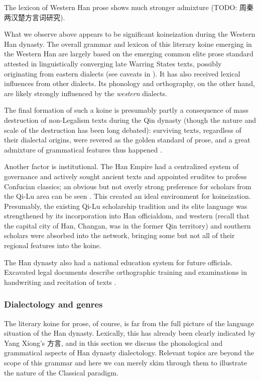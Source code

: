 \documentclass[UTF8, a4paper, oneside, scheme=plain, 12pt]{ctexrep}
\newcommand*{\citepage}[1]{p.~{#1}}
\begin{document}
The lexicon of Western Han prose shows much stronger admixture (TODO: 周秦两汉楚方言词研究).

What we observe above appears to be significant koineization during the Western Han dynasty.
The overall grammar and lexicon of this literary koine emerging in the Western Han are largely based on the emerging common elite prose standard attested in linguistically converging late Warring States texts,
possibly originating from eastern dialects 
(see caveats in ).
It has also received lexical influences from other dialects.
Its phonology and orthography, on the other hand, are likely strongly influenced by the \emph{western} dialects.

The final formation of such a koine is presumably partly a consequence of mass destruction of non-Legalism texts during the Qin dynasty (though the nature and scale of the destruction has been long debated):
surviving texts, regardless of their dialectal origins, were revered as the golden standard of prose, and a great admixture of grammatical features thus happened \citep[\citepage{94}]{karlgren1936zuozhuan}.

Another factor is institutional.
The Han Empire had a centralized system of governance and actively sought ancient texts and appointed erudites to profess Confucian classics; an obvious but not overly strong preference for scholars from the Qi-Lu area can be seen \citep{cai2019han}.
This created an ideal environment for koineization.
Presumably, the existing Qi-Lu scholarship tradition and its elite language was strengthened by its incorporation into Han officialdom,
and western (recall that the capital city of Han, Changan, was in the former Qin territory) and southern scholars were absorbed into the network,
bringing some but not all of their regional features into the koine.

The Han dynasty also had a national education system for future officials.
Excavated legal documents describe orthographic training and examinations in handwriting and recitation of texts \citep{li2007scribe}.

\subsubsection{Dialectology and genres}\label{sec:introduction.history.han.dialect}

The literary koine for prose, of course, is far from the full picture of the language situation of the Han dynasty.
Lexically, this has already been clearly indicated by Yang Xiong's 方言,
and in this section we discuss the phonological and grammatical aspects of Han dynasty dialectology. 
Relevant topics are beyond the scope of this grammar and here we can merely skim through them to illustrate the nature of the Classical paradigm.
\end{document}
